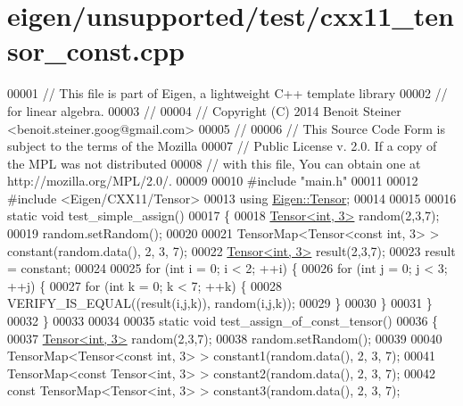 \hypertarget{eigen_2unsupported_2test_2cxx11__tensor__const_8cpp_source}{}\section{eigen/unsupported/test/cxx11\+\_\+tensor\+\_\+const.cpp}
\label{eigen_2unsupported_2test_2cxx11__tensor__const_8cpp_source}

\begin{DoxyCode}
00001 \textcolor{comment}{// This file is part of Eigen, a lightweight C++ template library}
00002 \textcolor{comment}{// for linear algebra.}
00003 \textcolor{comment}{//}
00004 \textcolor{comment}{// Copyright (C) 2014 Benoit Steiner <benoit.steiner.goog@gmail.com>}
00005 \textcolor{comment}{//}
00006 \textcolor{comment}{// This Source Code Form is subject to the terms of the Mozilla}
00007 \textcolor{comment}{// Public License v. 2.0. If a copy of the MPL was not distributed}
00008 \textcolor{comment}{// with this file, You can obtain one at http://mozilla.org/MPL/2.0/.}
00009 
00010 \textcolor{preprocessor}{#include "main.h"}
00011 
00012 \textcolor{preprocessor}{#include <Eigen/CXX11/Tensor>}
00013 \textcolor{keyword}{using} \hyperlink{class_eigen_1_1_tensor}{Eigen::Tensor};
00014 
00015 
00016 \textcolor{keyword}{static} \textcolor{keywordtype}{void} test\_simple\_assign()
00017 \{
00018   \hyperlink{class_eigen_1_1_tensor}{Tensor<int, 3>} random(2,3,7);
00019   random.setRandom();
00020 
00021   TensorMap<Tensor<const int, 3> > constant(random.data(), 2, 3, 7);
00022   \hyperlink{class_eigen_1_1_tensor}{Tensor<int, 3>} result(2,3,7);
00023   result = constant;
00024 
00025   \textcolor{keywordflow}{for} (\textcolor{keywordtype}{int} i = 0; i < 2; ++i) \{
00026     \textcolor{keywordflow}{for} (\textcolor{keywordtype}{int} j = 0; j < 3; ++j) \{
00027       \textcolor{keywordflow}{for} (\textcolor{keywordtype}{int} k = 0; k < 7; ++k) \{
00028         VERIFY\_IS\_EQUAL((result(i,j,k)), random(i,j,k));
00029       \}
00030     \}
00031   \}
00032 \}
00033 
00034 
00035 \textcolor{keyword}{static} \textcolor{keywordtype}{void} test\_assign\_of\_const\_tensor()
00036 \{
00037   \hyperlink{class_eigen_1_1_tensor}{Tensor<int, 3>} random(2,3,7);
00038   random.setRandom();
00039 
00040   TensorMap<Tensor<const int, 3> > constant1(random.data(), 2, 3, 7);
00041   TensorMap<const Tensor<int, 3> > constant2(random.data(), 2, 3, 7);
00042   \textcolor{keyword}{const} TensorMap<Tensor<int, 3> > constant3(random.data(), 2, 3, 7);

\end{DoxyCode}
